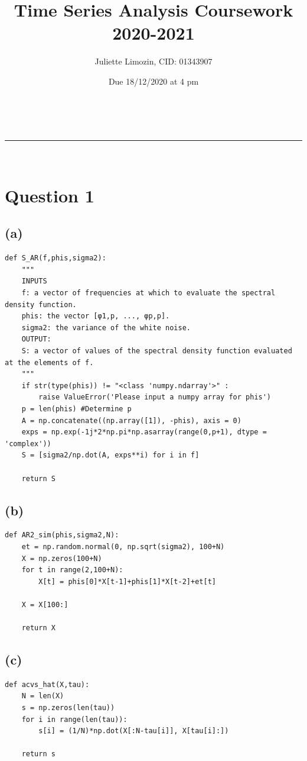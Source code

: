 \documentclass[a4paper,11pt]{article}
\makeatletter
\newcommand{\linia}{\rule{\linewidth}{0.5pt}}
\theoremstyle{mytheor}
\renewcommand{\maketitle}{
\begin{center}
\vspace{2ex}
{\huge \textsc{\@title}}
\vspace{1ex}
\\
\linia\\
\@author \hfill \@date
\vspace{1ex}
\end{center}
}
\makeatother
\begin{document}
\title{Time Series Analysis Coursework 2020-2021}

\author{Juliette Limozin, CID: 01343907}

\date{Due 18/12/2020 at 4 pm}

\maketitle

\section*{Question 1}
\subsection*{(a)}

\begin{lstlisting}
def S_AR(f,phis,sigma2):
    """
    INPUTS
    f: a vector of frequencies at which to evaluate the spectral density function.
    phis: the vector [φ1,p, ..., φp,p].
    sigma2: the variance of the white noise.
    OUTPUT:
    S: a vector of values of the spectral density function evaluated at the elements of f.
    """
    if str(type(phis)) != "<class 'numpy.ndarray'>" :
        raise ValueError('Please input a numpy array for phis')
    p = len(phis) #Determine p
    A = np.concatenate((np.array([1]), -phis), axis = 0)
    exps = np.exp(-1j*2*np.pi*np.asarray(range(0,p+1), dtype = 'complex'))
    S = [sigma2/np.dot(A, exps**i) for i in f]
    
    return S
\end{lstlisting}

\subsection*{(b)}

\begin{lstlisting}
def AR2_sim(phis,sigma2,N):
    et = np.random.normal(0, np.sqrt(sigma2), 100+N)
    X = np.zeros(100+N)
    for t in range(2,100+N):
        X[t] = phis[0]*X[t-1]+phis[1]*X[t-2]+et[t]
    
    X = X[100:]
    
    return X
\end{lstlisting}

\subsection*{(c)}
\begin{lstlisting}
def acvs_hat(X,tau):
    N = len(X)
    s = np.zeros(len(tau))
    for i in range(len(tau)):
        s[i] = (1/N)*np.dot(X[:N-tau[i]], X[tau[i]:])
    
    return s
\end{lstlisting}
\newpage
\end{document}
